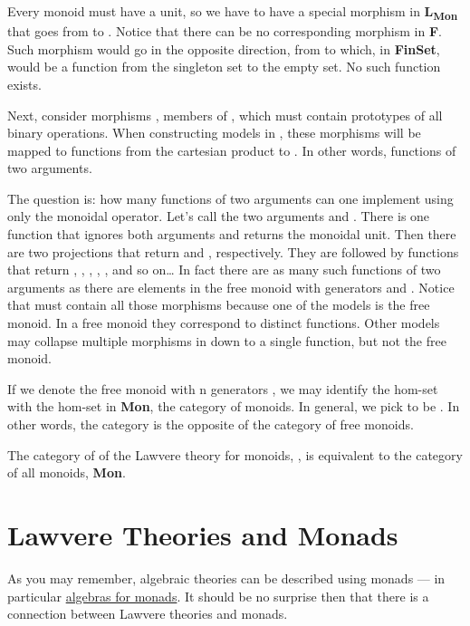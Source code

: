 Every monoid must have a unit, so we have to have a special morphism
 in \textbf{L\textsubscript{Mon}} that goes from  to
. Notice that there can be no corresponding morphism in
\textbf{F}. Such morphism would go in the opposite direction, from
 to  which, in \textbf{FinSet}, would be a function
from the singleton set to the empty set. No such function exists.

Next, consider morphisms , members of
, which must contain prototypes of all binary
operations. When constructing models in , these
morphisms will be mapped to functions from the cartesian product
 to . In other words, functions of
two arguments.

The question is: how many functions of two arguments can one implement
using only the monoidal operator. Let's call the two arguments
 and . There is one function that ignores both
arguments and returns the monoidal unit. Then there are two projections
that return  and , respectively. They are followed
by functions that return , , ,
, , and so on\ldots{} In fact there are as many
such functions of two arguments as there are elements in the free monoid
with generators  and . Notice that
 must contain all those morphisms because one of the
models is the free monoid. In a free monoid they correspond to distinct
functions. Other models may collapse multiple morphisms in
 down to a single function, but not the free monoid.

If we denote the free monoid with n generators , we may
identify the hom-set  with the hom-set
 in \textbf{Mon}, the category of monoids. In
general, we pick  to be . In
other words, the category  is the opposite of the category
of free monoids.

The category of  of the Lawvere theory for monoids,
, is equivalent to the category of all monoids,
\textbf{Mon}.

\section{Lawvere Theories and
Monads}\label{lawvere-theories-and-monads}

As you may remember, algebraic theories can be described using monads
--- in particular
\href{https://bartoszmilewski.com/2017/03/14/algebras-for-monads/}{algebras
for monads}. It should be no surprise then that there is a connection
between Lawvere theories and monads.

